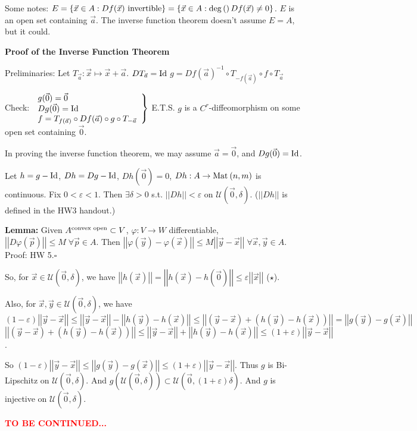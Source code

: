 \documentclass[10pt,letterpaper]{article}
\newcommand{\n}{\hfill\break}
\newcommand{\lemma}[1]{\par\noindent\settowidth{\hangindent}{\textbf{Lemma: }}\textbf{Lemma: }#1\n}
\newcommand{\proven}{\;$\square$\n}
\newcommand{\ptxt}[1]{\textrm{\textnormal{#1}}}
\newcommand{\set}[1]{\left\{#1\right\}}
\renewcommand{\deg}[1]{\ptxt{deg}\left(#1\right)}
\newcommand{\inv}{^{-1}}
\newcommand{\abs}[1]{\left|#1\right|}
\newcommand{\of}{\circ}
\renewcommand{\epsilon}{\varepsilon}
\newcommand{\Id}{\textrm{\textnormal{Id}}}
\newcommand{\norm}[1]{\abs{\abs{#1}}}
\newcommand{\Mat}{\ptxt{Mat}\>}
\newcommand{\uball}{\mathcal{U}}
\newcommand{\st}{s.t.}
\newcommand{\flag}[1]{\textbf{\textcolor{red}{#1}}}
\begin{document}
\par\noindent Some notes: $E=\set{\vec{x}\in{}A:Df(\vec{x})\ptxt{ invertible}}=\set{\vec{x}\in{}A:\deg{}Df(\vec{x})\ne{}0}$.\n
$E$ is an open set containing $\vec{a}$. The inverse function theorem doesn't assume $E=A$, but it could.\n

\par\noindent\textbf{Proof of the Inverse Function Theorem}\n

\par\noindent Preliminaries: Let $T_{\vec{a}}:\vec{x}\mapsto\vec{x}+\vec{a}$.\n
\phantom{Preliminaries:} $DT_{\vec{a}}=\Id$\n
\phantom{Preliminaries:} $g=Df(\vec{a})\inv\of{}T_{-f(\vec{a})}\of{}f\of{}T_{\vec{a}}$\n

\par\noindent Check: $\left.\begin{array}{l}g(\vec{0})=\vec{0}\\ Dg(\vec{0})=\Id\\ f=T_{f(\vec{a})}\of{}Df(\vec{a})\of{}g\of{}T_{-\vec{a}}\end{array}\right\}$ E.T.S. $g$ is a $C^{r}$-diffeomorphism on some open set containing $\vec{0}$.\n
\n

\par\noindent In proving the inverse function theorem, we may assume $\vec{a}=\vec{0}$, and $Dg(\vec{0})=\Id$.\n

\par\noindent Let $h=g-\Id$, $Dh=Dg-\Id$, $Dh(\vec{0})=0$, $Dh:A\to\Mat(n,m)$ is continuous.\n
Fix $0<\epsilon<1$. Then $\exists\delta>0$ \st{} $\norm{Dh}<\epsilon$ on $\uball(\vec{0},\delta)$. ($\norm{Dh}$ is defined in the HW3 handout.)\n

\lemma{Given $A^{\ptxt{convex open}}\subset{}V$, $\varphi:V\to{}W$ differentiable, $\norm{D\varphi(\vec{p})}\le{}M\;\forall\vec{p}\in{}A$.\n
Then $\norm{\varphi(\vec{y})-\varphi(\vec{x})}\le{}M\norm{\vec{y}-\vec{x}}\;\forall\vec{x},\vec{y}\in{}A$.\n
Proof: HW 5.\proven}

\par\noindent So, for $\vec{x}\in\uball(\vec{0},\delta)$, we have $\norm{h(\vec{x})}=\norm{h(\vec{x})-h(\vec{0})}\le\epsilon\norm{\vec{x}}$ ($\star$).\n

\par\noindent Also, for $\vec{x},\vec{y}\in\uball(\vec{0},\delta)$, we have\n
$(1-\epsilon)\norm{\vec{y}-\vec{x}}\le\norm{\vec{y}-\vec{x}}-\norm{h(\vec{y})-h(\vec{x})}\le\norm{(\vec{y}-\vec{x})+(h(\vec{y})-h(\vec{x}))}=\norm{g(\vec{y})-g(\vec{x})}$\n
$\norm{(\vec{y}-\vec{x})+(h(\vec{y})-h(\vec{x}))}\le\norm{\vec{y}-\vec{x}}+\norm{h(\vec{y})-h(\vec{x})}\le(1+\epsilon)\norm{\vec{y}-\vec{x}}$.\n

\par\noindent So $(1-\epsilon)\norm{\vec{y}-\vec{x}}\le\norm{g(\vec{y})-g(\vec{x})}\le(1+\epsilon)\norm{\vec{y}-\vec{x}}$. Thus $g$ is Bi-Lipschitz on $\uball(\vec{0},\delta)$.\n
And $g(\uball(\vec{0},\delta))\subset\uball(\vec{0},(1+\epsilon)\delta)$.\n
And $g$ is injective on $\uball(\vec{0},\delta)$.\n

\par\noindent\flag{TO BE CONTINUED...}
\end{document}

